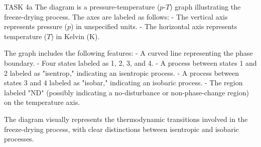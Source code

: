 TASK 4a  
The diagram is a pressure-temperature (\( p \)-\( T \)) graph illustrating the freeze-drying process. The axes are labeled as follows:  
- The vertical axis represents pressure (\( p \)) in unspecified units.  
- The horizontal axis represents temperature (\( T \)) in Kelvin (\( \text{K} \)).  

The graph includes the following features:  
- A curved line representing the phase boundary.  
- Four states labeled as 1, 2, 3, and 4.  
- A process between states 1 and 2 labeled as "isentrop," indicating an isentropic process.  
- A process between states 3 and 4 labeled as "isobar," indicating an isobaric process.  
- The region labeled "ND" (possibly indicating a no-disturbance or non-phase-change region) on the temperature axis.  

The diagram visually represents the thermodynamic transitions involved in the freeze-drying process, with clear distinctions between isentropic and isobaric processes.